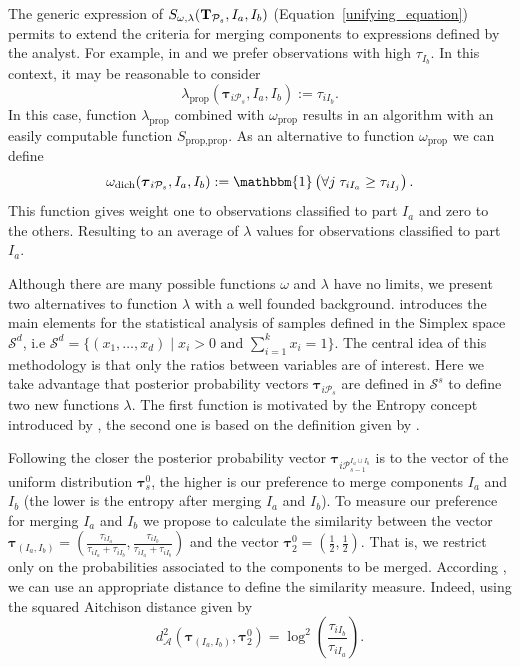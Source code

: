 \documentclass[submit]{smj}
\theoremstyle{definition}
\newcommand{\m}[1]{\boldsymbol{#1}}
\begin{document}
The generic expression of $S_{\omega, \lambda}(\text{\textbf{T}}_{\mathcal{P}_s},  I_a,  I_b)$ (Equation~\ref{unifying_equation}) permits to extend the criteria for merging components to expressions defined by the analyst. For example, in \cite{hennig2010methods} and \cite{longford2014} we prefer observations with high $\tau_{I_b}$. In this context, it may be reasonable to consider
\[
\lambda_{\text{prop}}(\m\tau_{i \mathcal{P}_s},  I_a,  I_b) := \tau_{iI_b}.
\]
In this case, function $\lambda_{\text{prop}}$ combined with $\omega_{\text{prop}}$ results in an algorithm with an easily computable function $S_{\text{prop}, \text{prop}}$. As an alternative to function $\omega_{\text{prop}}$ we can define 
\[
\omega_{\text{dich}}(\m\tau_{i \mathcal{P}_s},  I_a,  I_b) := \mathbbm{1}\left( \forall j\; \tau_{i I_{a}} \geq \tau_{iI_j} \right).
\]
This function gives weight one to observations classified to part $I_a$ and zero to the others. Resulting to an average of $\lambda$ values for observations classified to part $I_a$. 

Although there are many possible functions $\omega$ and $\lambda$ have no limits, we present two alternatives to function $\lambda$ with a well founded background. \cite{aitchison1986statistical} introduces the main elements for the statistical analysis of samples defined in the Simplex space $\mathcal{S}^d$, i.e $\mathcal{S}^d = \{ (x_1,\dots, x_d) \;|\; x_i > 0 \text{ and } \sum_{i=1}^k x_i = 1 \}$. The central idea of this methodology is that only the ratios between variables are of interest. Here we take advantage that posterior probability vectors $\m\tau_{i\mathcal{P}_s}$ are defined in $\mathcal{S}^s$ to define two new functions $\lambda$. The first function is motivated by the Entropy concept introduced by \cite{baudry2010combining}, the second one is based on the definition given by \cite{longford2014}.


Following \cite{baudry2010combining} the closer the posterior probability vector $\m\tau_{i \mathcal{P}_{s-1}^{I_a\cup I_b}}$ is to the vector of the uniform distribution $\m\tau_s^0$, the higher is our preference to merge components $I_a$ and $I_b$ (the lower is the entropy after merging $I_a$ and $I_b$). To measure our preference for merging $I_a$ and $I_b$ we propose to calculate the similarity between the vector $\m\tau_{\left(I_a, I_b\right)} = (\frac{\tau_{i I_a}}{\tau_{i I_a} + \tau_{i I_b}}, \frac{\tau_{i I_b}}{\tau_{i I_a} + \tau_{i I_b}})$ and the vector $\m\tau_2^0=\left(\frac{1}{2}, \frac{1}{2}\right)$. That is, we restrict only on the probabilities associated to the components to be merged. According  \cite{frey2007}, we can use an appropriate distance to define the similarity measure. Indeed, using the squared Aitchison distance \citep{palarea2012dealing} given by
\[
d_\mathcal{A}^2\left(\m\tau_{\left(I_a, I_b\right)}, \m\tau_2^0 \right) = \log^2 \left(\frac{ \tau_{iI_b} }{ \tau_{iI_a} }\right).
\]
\end{document}
